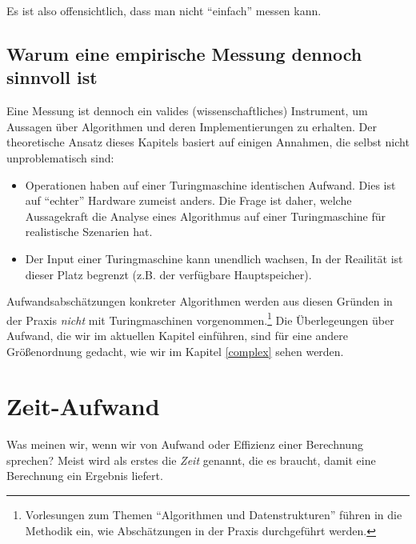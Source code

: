 Es ist also offensichtlich,
dass man nicht ``einfach'' messen kann.


\subsection{Warum eine empirische Messung dennoch sinnvoll ist}
Eine Messung ist dennoch ein valides (wissenschaftliches) Instrument,
um Aussagen über Algorithmen und deren Implementierungen zu erhalten.
Der theoretische Ansatz dieses Kapitels basiert auf einigen Annahmen,
die selbst nicht unproblematisch sind:
\begin{itemize}
  \item Operationen haben auf einer Turingmaschine identischen Aufwand.
    Dies ist auf ``echter'' Hardware zumeist anders.
    Die Frage ist daher, welche Aussagekraft die Analyse eines Algorithmus auf einer Turingmaschine für realistische Szenarien hat.
  \item Der Input einer Turingmaschine kann unendlich wachsen,
      In der Reailität ist dieser Platz begrenzt (z.B. der verfügbare Hauptspeicher).
\end{itemize}

Aufwandsabschätzungen konkreter Algorithmen werden aus diesen Gründen in der Praxis \emph{nicht} mit Turingmaschinen vorgenommen.\footnote{%
    Vorlesungen zum Themen ``Algorithmen und Datenstrukturen'' führen in die Methodik ein,
    wie Abschätzungen in der Praxis durchgeführt werden.}
Die Überlegeungen über Aufwand, die wir im aktuellen Kapitel einführen,
sind für eine andere Größenordnung gedacht,
wie wir im Kapitel \autoref{complex} sehen werden.

\section{Zeit-Aufwand}

Was meinen wir, wenn wir von Aufwand oder Effizienz einer Berechnung sprechen?
Meist wird als erstes die \emph{Zeit} genannt,
die es braucht,
damit eine Berechnung ein Ergebnis liefert.

